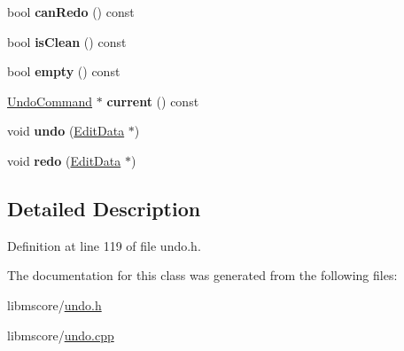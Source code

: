 \begin{DoxyCompactItemize}
bool {\bfseries can\+Redo} () const
\item 
\mbox{\label{class_ms_1_1_undo_stack_ad1c947141f618f0f9089e959157bd338}} 
bool {\bfseries is\+Clean} () const
\item 
\mbox{\label{class_ms_1_1_undo_stack_a7c2d150108b3461272edb8d61ade3839}} 
bool {\bfseries empty} () const
\item 
\mbox{\label{class_ms_1_1_undo_stack_a275a82f238fff439c8e6c2e7b129dde7}} 
\hyperlink{class_ms_1_1_undo_command}{Undo\+Command} $\ast$ {\bfseries current} () const
\item 
\mbox{\label{class_ms_1_1_undo_stack_a7f2b4316d0eb51dab916e2c3d3f0cc2b}} 
void {\bfseries undo} (\hyperlink{class_ms_1_1_edit_data}{Edit\+Data} $\ast$)
\item 
\mbox{\label{class_ms_1_1_undo_stack_a5c50661b1a83d1d55df64eb1e18a0f16}} 
void {\bfseries redo} (\hyperlink{class_ms_1_1_edit_data}{Edit\+Data} $\ast$)
\end{DoxyCompactItemize}


\subsection{Detailed Description}


Definition at line 119 of file undo.\+h.



The documentation for this class was generated from the following files\+:\begin{DoxyCompactItemize}
\item 
libmscore/\hyperlink{undo_8h}{undo.\+h}\item 
libmscore/\hyperlink{undo_8cpp}{undo.\+cpp}\end{DoxyCompactItemize}
